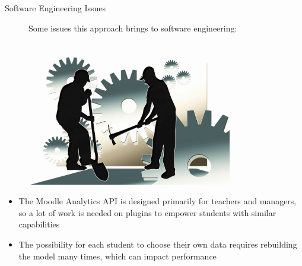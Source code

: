 \begin{frame}{Software Engineering Issues}

    \begin{figure}
        \centering
        \begin{minipage}{.7\textwidth}
            Some issues this approach brings to software engineering:
        \end{minipage}%
        \begin{minipage}{.25\textwidth}
          \centering
          \includegraphics[width=0.8\textwidth]{../../images/work-workers-men.jpg}
        \end{minipage}
    \end{figure}

    \begin{itemize}[<+-|alert@+>]\color{gray}
        \item The Moodle Analytics API is designed primarily for teachers and managers, so a lot of 
              work is needed on plugins to empower students with similar capabilities
        \item The possibility for each student to choose their own data requires 
              rebuilding the model many times, which can impact performance
    \end{itemize}
\end{frame}

